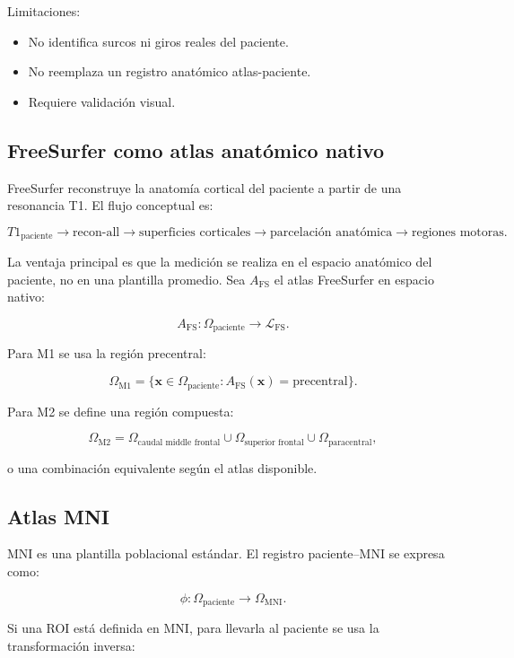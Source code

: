 \documentclass[12pt,a4paper]{article}
\begin{document}
Limitaciones:

\begin{itemize}
    \item No identifica surcos ni giros reales del paciente.
    \item No reemplaza un registro anatómico atlas-paciente.
    \item Requiere validación visual.
\end{itemize}

\subsection{FreeSurfer como atlas anatómico nativo}

FreeSurfer reconstruye la anatomía cortical del paciente a partir de una resonancia T1. El flujo conceptual es:

\[
T1_{\text{paciente}}
\rightarrow
\text{recon-all}
\rightarrow
\text{superficies corticales}
\rightarrow
\text{parcelación anatómica}
\rightarrow
\text{regiones motoras}.
\]

La ventaja principal es que la medición se realiza en el espacio anatómico del paciente, no en una plantilla promedio. Sea \(A_{\text{FS}}\) el atlas FreeSurfer en espacio nativo:

\[
A_{\text{FS}}:\Omega_{\text{paciente}}\rightarrow \mathcal{L}_{\text{FS}}.
\]

Para M1 se usa la región precentral:

\[
\Omega_{\text{M1}} =
\{\mathbf{x}\in\Omega_{\text{paciente}}:
A_{\text{FS}}(\mathbf{x})=\text{precentral}\}.
\]

Para M2 se define una región compuesta:

\[
\Omega_{\text{M2}}
=
\Omega_{\text{caudal middle frontal}}
\cup
\Omega_{\text{superior frontal}}
\cup
\Omega_{\text{paracentral}},
\]

o una combinación equivalente según el atlas disponible.

\subsection{Atlas MNI}

MNI es una plantilla poblacional estándar. El registro paciente--MNI se expresa como:

\[
\phi:\Omega_{\text{paciente}}\rightarrow\Omega_{\text{MNI}}.
\]

Si una ROI está definida en MNI, para llevarla al paciente se usa la transformación inversa:
\end{document}

